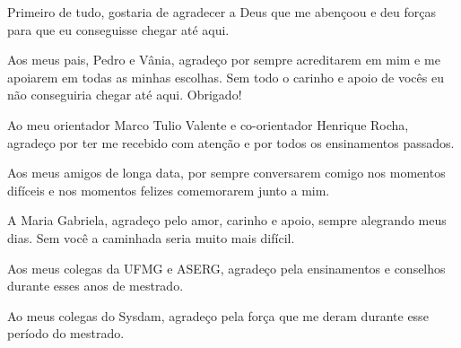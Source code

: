 Primeiro de tudo, gostaria de agradecer a Deus que me abençoou e deu forças para que
eu conseguisse chegar até aqui.

Aos meus pais, Pedro e Vânia, agradeço por sempre acreditarem em mim e me apoiarem em todas as minhas escolhas. Sem todo o carinho e apoio de vocês eu não conseguiria chegar até aqui. Obrigado!

Ao meu orientador Marco Tulio Valente e co-orientador Henrique Rocha, agradeço por ter me recebido com atenção e por todos os ensinamentos passados.

Aos meus amigos de longa data, por sempre conversarem comigo nos momentos difíceis e nos momentos felizes comemorarem junto a mim.

A Maria Gabriela, agradeço pelo amor, carinho e apoio, sempre alegrando meus dias. Sem você a caminhada seria muito mais difícil.

Aos meus colegas da UFMG e ASERG, agradeço pela ensinamentos e conselhos durante esses anos de mestrado.

Ao meus colegas do Sysdam, agradeço pela força que me deram durante esse período do mestrado.
